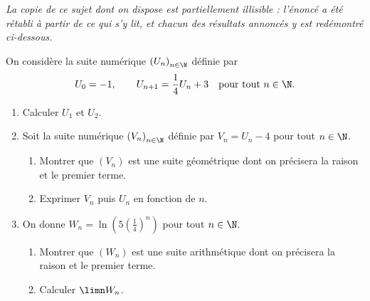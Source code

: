 \begin{commeaubac}
\emph{La copie de ce sujet dont on dispose est partiellement illisible :
l'énoncé a été rétabli à partir de ce qui s'y lit, et chacun des résultats
annoncés y est redémontré ci-dessous.}

On considère la suite numérique $\left(U_{n}\right)_{n \in \N}$ définie par
\[
  U_{0} = -1, \qquad U_{n+1} = \frac14 U_{n}+3 \quad
  \text{pour tout } n \in \N .
\]

\begin{enumerate}[label=\textbf{\arabic*.}, leftmargin=*, itemsep=0.25em]
  \item Calculer $U_{1}$ et $U_{2}$. 
  \item Soit la suite numérique $\left(V_{n}\right)_{n \in \N}$ définie par
        $V_{n} = U_{n}-4$ pour tout $n \in \N$.
    \begin{enumerate}[label=\textbf{\alph*)}, leftmargin=1.4em, itemsep=0.15em]
      \item Montrer que $\left(V_{n}\right)$ est une suite géométrique dont
            on précisera la raison et le premier terme. 
      \item Exprimer $V_{n}$ puis $U_{n}$ en fonction de $n$.
    \end{enumerate}
  \item On donne $W_{n} = \ln\left(5\left(\frac14\right)^{n}\right)$ pour
        tout $n \in \N$.
    \begin{enumerate}[label=\textbf{\alph*)}, leftmargin=1.4em, itemsep=0.15em]
      \item Montrer que $\left(W_{n}\right)$ est une suite arithmétique dont
            on précisera la raison et le premier terme. 
      \item Calculer $\displaystyle\limn W_{n}$. 
    \end{enumerate}
\end{enumerate}
\end{commeaubac}

